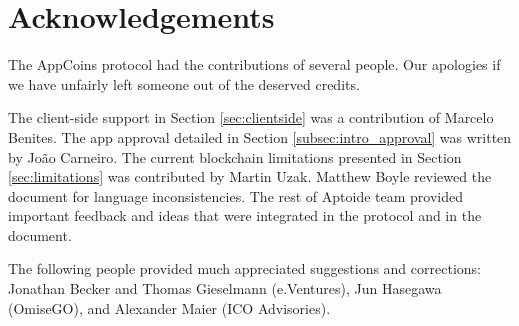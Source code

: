\section{Acknowledgements}
\label{sec:acknowledgements}

The AppCoins protocol had the contributions of several people. Our apologies if we have unfairly left someone out of the deserved credits.

\medskip

The client-side support in Section \ref{sec:clientside} was a contribution of Marcelo Benites. The app approval detailed in Section \ref{subsec:intro_approval} was written by Jo\~ao Carneiro. The current blockchain limitations presented in Section \ref{sec:limitations} was contributed by Martin Uzak. Matthew Boyle reviewed the document for language inconsistencies. The rest of Aptoide team provided important feedback and ideas that were integrated in the protocol and in the document.

\medskip

The following people provided much appreciated suggestions and corrections: Jonathan Becker and Thomas Gieselmann (e.Ventures), Jun Hasegawa (OmiseGO), and Alexander Maier (ICO Advisories).
